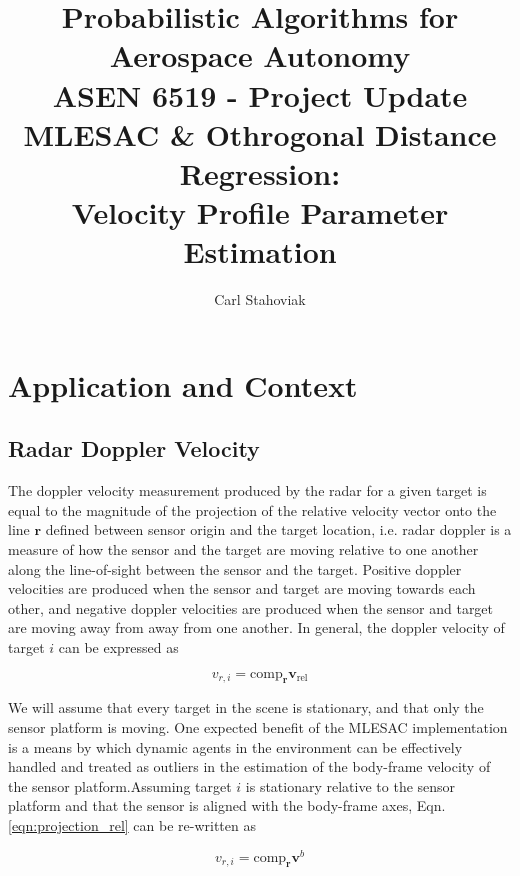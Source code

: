 \documentclass[]{article}
\title{Probabilistic Algorithms for Aerospace Autonomy\\ASEN 6519 - Project Update\\MLESAC \& Othrogonal Distance Regression:\\ Velocity Profile Parameter Estimation}
\author{Carl Stahoviak}
\begin{document}
\maketitle

%

\tableofcontents

\newpage
\section{Application and Context}

\subsection{Radar Doppler Velocity}

The doppler velocity measurement produced by the radar for a given target is equal to the magnitude of the projection of the relative velocity vector onto the line $\mathbf{r}$ defined between sensor origin and the target location, i.e. radar doppler is a measure of how the sensor and the target are moving relative to one another along the line-of-sight between the sensor and the target. Positive doppler velocities are produced when the sensor and target are moving towards each other, and negative doppler velocities are produced when the sensor and target are moving away from away from one another. In general, the doppler velocity of target $i$ can be expressed as 

\begin{equation}
	v_{r,i} = \text{comp}_{\mathbf{r}} \mathbf{v}_{\text{rel}}
	\label{eqn:projection_rel}
\end{equation}

We will assume that every target in the scene is stationary, and that only the sensor platform is moving. One expected benefit of the MLESAC implementation is a means by which dynamic agents in the environment can be effectively handled and treated as outliers in the estimation of the body-frame velocity of the sensor platform.Assuming target $i$ is stationary relative to the sensor platform and that the sensor is aligned with the body-frame axes, Eqn. \ref{eqn:projection_rel} can be re-written as

\begin{equation}
	v_{r,i} = \text{comp}_{\mathbf{r}} \mathbf{v}^b
	\label{eqn:projection_body}
\end{equation}
\end{document}
